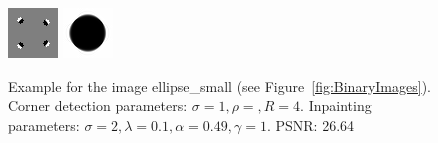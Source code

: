 \begin{figure}[h]
    \centering
    \includegraphics[width=0.2\linewidth]{../Images/ellipse_small-mask.png}
    \includegraphics[width=0.2\linewidth]{../Images/ellipse_small-inpaint.png}
    \caption{Example for the image ellipse\_small (see Figure~\ref{fig:BinaryImages}). Corner
    detection parameters: $\sigma=1,\rho=,R=4$. Inpainting parameters:
$\sigma=2,\lambda=0.1,\alpha=0.49,\gamma=1$. PSNR: 26.64}
    \label{fig:EllipseSmallExample}
\end{figure}



